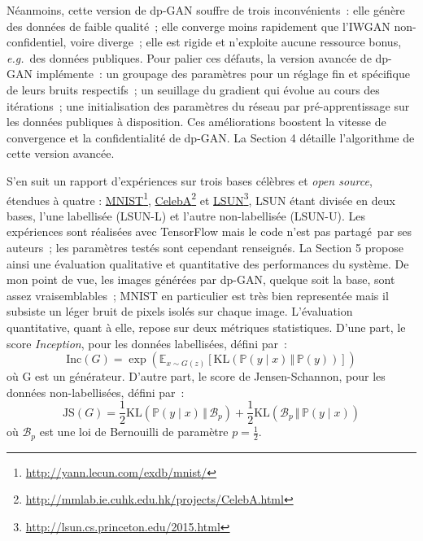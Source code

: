 \documentclass[a4paper,11pt]{article}
\theoremstyle{definition}
\newcommand{\fnhref}[2]{\href{#1}{#2}\footnote{\url{#1}}}
\newcommand{\eg}{\textit{e.g.}}
\begin{document}
Néanmoins, cette version de dp-GAN souffre de trois inconvénients : elle génère des données de faible qualité ; elle converge moins rapidement que l'IWGAN non-confidentiel, voire diverge ; elle est rigide et n'exploite aucune ressource bonus, \eg\ des données publiques. Pour palier ces défauts, la version avancée de dp-GAN implémente : un groupage des paramètres pour un réglage fin et spécifique de leurs bruits respectifs ; un seuillage du gradient qui évolue au cours des itérations ; une initialisation des paramètres du réseau par pré-apprentissage sur les données publiques à disposition. Ces améliorations boostent la vitesse de convergence et la confidentialité de dp-GAN. La Section 4 détaille l'algorithme de  cette version avancée.

S'en suit un rapport d'expériences sur trois bases célèbres et \textit{open source}, étendues à quatre : \fnhref{http://yann.lecun.com/exdb/mnist/}{MNIST}, \fnhref{http://mmlab.ie.cuhk.edu.hk/projects/CelebA.html}{CelebA} et \fnhref{http://lsun.cs.princeton.edu/2015.html}{LSUN}, LSUN étant divisée en deux bases, l'une labellisée (LSUN-L) et l'autre non-labellisée (LSUN-U). Les expériences sont réalisées avec TensorFlow mais le code n'est pas partagé par ses auteurs ; les paramètres testés sont cependant renseignés. La Section 5 propose ainsi une évaluation qualitative et quantitative des performances du système. De mon point de vue, les images générées par dp-GAN, quelque soit la base, sont assez vraisemblables ; MNIST en particulier est très bien representée mais il subsiste un léger bruit de pixels isolés sur chaque image. L'évaluation quantitative, quant à elle, repose sur deux métriques statistiques. D'une part, le score \textit{Inception}, pour les données labellisées, défini par :
\begin{equation}
    \label{incep}
    \mathrm{Inc}(G) = \exp(\mathbb{E}_{x \sim G(z)}[\mathrm{KL}(\mathbb{P}(y \mid x)\,\Vert\, \mathbb{P}(y))])
\end{equation}
où G est un générateur.
D'autre part, le score de Jensen-Schannon, pour les données non-labellisées, défini par :
\begin{equation}
    \label{jens}
    \mathrm{JS}(G) = \frac{1}{2} \mathrm{KL}(\mathbb{P}(y \mid x)\,\Vert\,\mathscr{B}_p)
    + \frac{1}{2} \mathrm{KL}(\mathscr{B}_p\,\Vert\,\mathbb{P}(y \mid x))
\end{equation}
où $\mathscr{B}_p$ est une loi de Bernouilli de paramètre $p=\frac{1}{2}$.

\end{document}
